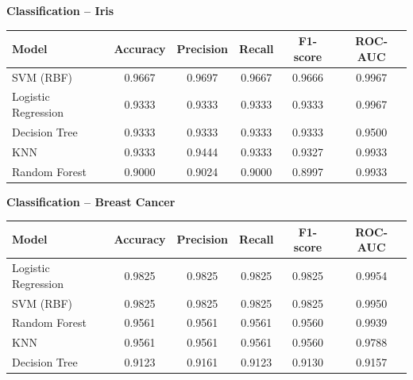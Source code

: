 \documentclass[12pt,a4paper]{article}
\newenvironment{fitwidth}
  {\begin{lrbox}{\fitbox}}
  {\end{lrbox}\ifdim\wd\fitbox>\linewidth\resizebox{\linewidth}{!}{\usebox{\fitbox}}\else\usebox{\fitbox}\fi}
\DeclareRobustCommand{\_}{\textunderscore\allowbreak}
\begin{document}
\begin{center}
\begin{minipage}{\linewidth}\centering
\textbf{Classification -- Iris}\par\smallskip
\begin{fitwidth}
\begin{tabular}{lccccc}
\toprule
Model & Accuracy & Precision & Recall & F1-score & ROC-AUC\\
\midrule
SVM (RBF) & 0.9667 & 0.9697 & 0.9667 & 0.9666 & 0.9967 \\
Logistic Regression & 0.9333 & 0.9333 & 0.9333 & 0.9333 & 0.9967 \\
Decision Tree & 0.9333 & 0.9333 & 0.9333 & 0.9333 & 0.9500 \\
KNN & 0.9333 & 0.9444 & 0.9333 & 0.9327 & 0.9933 \\
Random Forest & 0.9000 & 0.9024 & 0.9000 & 0.8997 & 0.9933 \\
\bottomrule
\end{tabular}
\end{fitwidth}
\end{minipage}
\end{center}

\vspace{0.3cm}
\begin{center}
\begin{minipage}{\linewidth}\centering
\textbf{Classification -- Breast Cancer}\par\smallskip
\begin{fitwidth}
\begin{tabular}{lccccc}
\toprule
Model & Accuracy & Precision & Recall & F1-score & ROC-AUC\\
\midrule
Logistic Regression & 0.9825 & 0.9825 & 0.9825 & 0.9825 & 0.9954 \\
SVM (RBF) & 0.9825 & 0.9825 & 0.9825 & 0.9825 & 0.9950 \\
Random Forest & 0.9561 & 0.9561 & 0.9561 & 0.9560 & 0.9939 \\
KNN & 0.9561 & 0.9561 & 0.9561 & 0.9560 & 0.9788 \\
Decision Tree & 0.9123 & 0.9161 & 0.9123 & 0.9130 & 0.9157 \\
\bottomrule
\end{tabular}
\end{fitwidth}
\end{minipage}
\end{center}
\end{document}
